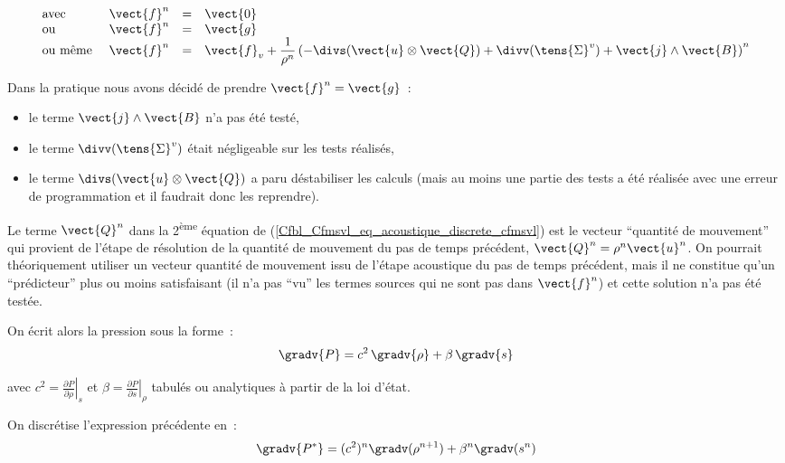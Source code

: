 \begin{equation}\label{Cfbl_Cfmsvl_eq_forces_supplementaires_cfmsvl}
\begin{array}{llll}
\text{avec\ }&\vect{f}^n &=& \vect{0} \\
\text{ou\ }&\vect{f}^n &=& \vect{g} \\
\text{ou m\^eme\ }&\vect{f}^n &=& \vect{f}_v
 + \displaystyle\frac{1}{\rho^n}
\left( - \divs(\vect{u} \otimes \vect{Q}) + \divv(\tens{\Sigma}^v)
 + \vect{j}\wedge\vect{B} \right)^n
\end{array}
\end{equation}

Dans la pratique nous avons décidé de prendre $\vect{f}^n=\vect{g}$~:
\begin{itemize}
  \item le terme $\vect{j}\wedge\vect{B}$ n'a pas été testé,
  \item le terme $\divv(\tens{\Sigma}^v)$ \'etait négligeable sur les tests
        réalisés,
  \item le terme $\divs(\vect{u} \otimes \vect{Q})$ a paru déstabiliser les
        calculs (mais au moins une partie des tests a \'et\'e r\'ealis\'ee
        avec une erreur de programmation et il faudrait donc les reprendre).
\end{itemize}
\bigskip

Le terme $\vect{Q}^n$ dans la 2\textsuperscript{\`eme} \'equation
de (\ref{Cfbl_Cfmsvl_eq_acoustique_discrete_cfmsvl}) est le vecteur ``quantit\'e de mouvement''
qui provient de l'\'etape de r\'esolution de la quantit\'e de mouvement du pas
de temps pr\'ec\'edent, $\vect{Q}^n = \rho^n \vect{u}^n$.
On pourrait théoriquement utiliser un vecteur quantit\'e de mouvement issu
de l'\'etape acoustique du pas de temps pr\'ec\'edent, mais il ne constitue
qu'un ``pr\'edicteur'' plus ou moins satisfaisant (il n'a pas ``vu'' les termes
sources qui ne sont pas dans  $\vect{f}^n$) et cette solution
n'a pas été testée.

\bigskip
On \'ecrit alors la pression sous la forme~:
\begin{equation}
\gradv{P}=c^2\,\gradv{\rho}+\beta\,\gradv{s}
\end{equation}

avec $c^2 = \left.\displaystyle\frac{\partial P}{\partial \rho}\right|_s$
et $\beta = \left.\displaystyle\frac{\partial P}{\partial s}\right|_\rho$
tabul\'es ou analytiques \`a partir de la loi d'\'etat.

On discr\'etise l'expression pr\'ec\'edente en~:
\begin{equation}
\gradv{P^*}=(c^2)^n\gradv(\rho^{n+1})+\beta^n\gradv(s^n)
\end{equation}

